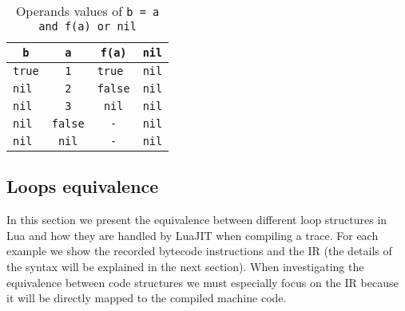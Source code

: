 \begin{table}[H]
    \centering
    \begin{tabular}{|c|c|c|c|}
        \hline
        \texttt{b} & \texttt{a}  & \texttt{f(a)}  & \texttt{nil}  \\
        \hline
		\texttt{true} & \texttt{  1  } & \texttt{true } & \texttt{nil} \\
		\texttt{nil } & \texttt{  2  } & \texttt{false} & \texttt{nil} \\
		\texttt{nil } & \texttt{  3  } & \texttt{ nil } & \texttt{nil} \\
		\texttt{nil } & \texttt{false} & \texttt{  -  } & \texttt{nil} \\
		\texttt{nil } & \texttt{ nil } & \texttt{  -  } & \texttt{nil} \\
        \hline
    \end{tabular}
    \caption{Operands values of \texttt{b = a and f(a) or nil}}
    \label{tab:and-function-transformation}
\end{table}



\newpage

\subsection{Loops equivalence}
In this section we present the equivalence between different loop structures in Lua and how they are handled by LuaJIT when compiling a trace. For each example we show the recorded bytecode instructions and the IR (the details of the syntax will be explained in the next section). When investigating the equivalence between code structures we must especially focus on the IR because it will be directly mapped to the compiled machine code.
